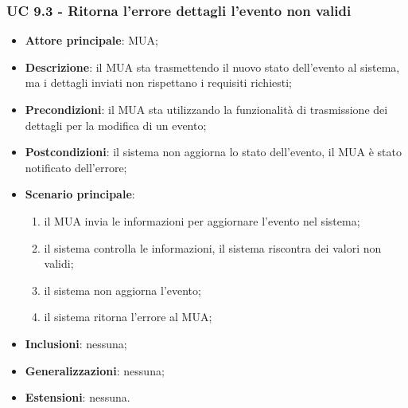 \subsubsection{UC 9.3 - Ritorna l'errore dettagli l'evento non validi} \label{sec:UC9.3}
    \begin{itemize}
        \item \textbf{Attore principale}: MUA;
        \item \textbf{Descrizione}: il MUA sta trasmettendo il nuovo stato dell'evento al sistema, ma i dettagli inviati non rispettano i requisiti richiesti;
        \item \textbf{Precondizioni}: il MUA sta utilizzando la funzionalità di trasmissione dei dettagli per la modifica di un evento;
        \item \textbf{Postcondizioni}: il sistema non aggiorna lo stato dell'evento, il MUA è stato notificato dell'errore;
        \item \textbf{Scenario principale}:
            \begin{enumerate}
                \item il MUA invia le informazioni per aggiornare l'evento nel sistema;
                \item il sistema controlla le informazioni, il sistema riscontra dei valori non validi;
                \item il sistema non aggiorna l'evento;
                \item il sistema ritorna l'errore al MUA;
            \end{enumerate}
        \item \textbf{Inclusioni}: nessuna;
        \item \textbf{Generalizzazioni}: nessuna;
        \item \textbf{Estensioni}: nessuna.
    \end{itemize}
